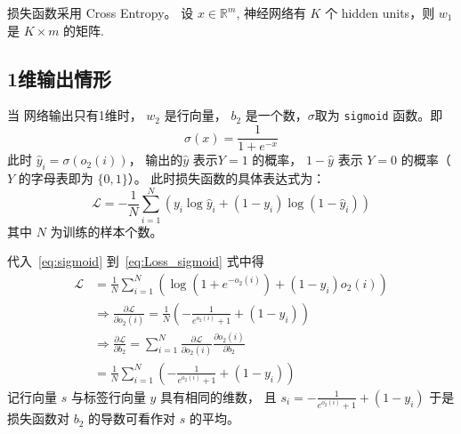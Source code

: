 \documentclass{ctexart}
\begin{document}
损失函数采用 Cross Entropy。 
设 $ x \in \mathbb{R}^m$, 神经网络有 $K$ 个 hidden units，则 $w_1$ 是 $ K \times m$ 的矩阵.
\subsection{1维输出情形}
    当 网络输出只有1维时，
     $w_2$ 是行向量， $b_2$ 是一个数，$\sigma$取为 \texttt{sigmoid} 函数。即
    \begin{equation}\label{eq:sigmoid}
    \sigma(x) = \frac{1}{1+e^{-x}}
    \end{equation}
    此时 $\hat{y}_i = \sigma(o_2(i))$，
    输出的$\hat{y}$ 表示$ Y = 1$ 的概率， $ 1 - \hat{y} $ 表示 $ Y = 0$ 
    的概率（$Y$ 的字母表即为 $\{0, 1\}$）。
    此时损失函数的具体表达式为：
    \begin{equation}\label{eq:Loss_sigmoid}
      \mathcal{L} = -\frac{1}{N} \sum_{i=1}^N\left(y_i\log \hat{y}_i + (1-y_i) \log (1  - \hat{y}_i) \right)
    \end{equation}
    其中 $N$ 为训练的样本个数。


代入~\eqref{eq:sigmoid} 到~\eqref{eq:Loss_sigmoid} 式中得
\begin{align}
\label{eq:loss_1}\mathcal{L} & = \frac{1}{N}\sum_{i=1}^N(\log (1+e^{-o_2(i)}) +(1-y_i)o_2(i)) \\
 &\Rightarrow 
\frac{\partial \mathcal{L}}{\partial o_2(i)}
= \frac{1}{N} (-\frac{1}{ e^{ o_2(i) } + 1 } + (1-y_i)) \\
&\Rightarrow  
\frac{\partial \mathcal{L}}{\partial b_2}
= \sum_{i=1}^N \frac{\partial \mathcal{L}}{\partial o_2(i)} \frac{\partial o_2(i)}{\partial b_2} \\
& = \frac{1}{N} \sum_{ i = 1 }^N (-\frac{1}{ e^{ o_2(i) } + 1 } + (1-y_i)) 
\end{align}
记行向量 $s$ 与标签行向量 $y$ 具有相同的维数， 且 $ s_i = -\frac{1}{ e^{ o_2(i) } + 1 } + (1-y_i) $
于是 损失函数对 $b_2 $ 的导数可看作对 $s$ 的平均。
\end{document}
